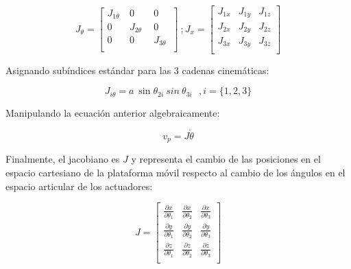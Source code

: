              \[ J_{ \theta }=  \left[ \begin{matrix}
            J_{1 \theta }~  &  0  &  0\\
            0  &  J_{2 \theta }~~  &  0\\
            0  &  0  &  J_{3 \theta }~\\ 
            \end{matrix}
             \right] ~  ;  J_{x}=\left[ \begin{matrix}
                J_{1x}  &  J_{1y}  &  J_{1z}\\
                J_{2x}  &  J_{2y}  &  J_{2z}\\
                J_{3x}  &  J_{3y}  &  J_{3z}\\
                \end{matrix}
                 \right]  \] 
            
            Asignando subíndices estándar para las 3 cadenas cinemáticas:
            
            \begin{equation}
              J_{i \theta }=a~\sin  \theta _{2i}~sin~ \theta _{3i}~~~,  i= \{ 1,2,3 \}   
            \end{equation}
            
            Manipulando la ecuación anterior algebraicamente:
            
            \begin{equation}
                 v_{p}=J\dot{ \theta }
            \end{equation}
            
            Finalmente, el jacobiano es   $J$  y representa el cambio de las posiciones en el espacio cartesiano de la plataforma móvil respecto al cambio de los ángulos en el espacio articular de los actuadores:
            
            \begin{equation}
                 J= \left[ \begin{matrix}
                \frac{ \partial x}{ \partial  \theta _{1}}  &  \frac{ \partial x}{ \partial  \theta _{2}}  &  \frac{ \partial x}{ \partial  \theta _{3}}\\
                \frac{ \partial y}{ \partial  \theta _{1}}  &  \frac{ \partial y}{ \partial  \theta _{2}}  &  \frac{ \partial y}{ \partial  \theta _{3}}\\
                \frac{ \partial z}{ \partial  \theta _{1}}  &  \frac{ \partial z}{ \partial  \theta _{2}}  &  \frac{ \partial z}{ \partial  \theta _{3}}\\
                \end{matrix}
                 \right]
            \end{equation}
            
